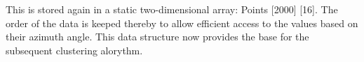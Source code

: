 \documentclass[11pt,oneside,openright]{mpreport}
\begin{document}
This is stored  again  in a static two-dimensional array: Points [2000] [16]. The order of the data is keeped thereby to allow efficient access to 
the values based on their azimuth angle. This data structure now provides the base for the subsequent clustering alorythm.

\end{document}
